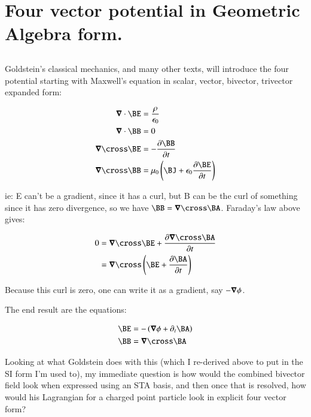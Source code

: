 \chapter{Four vector potential in Geometric Algebra form.} 

\section{}

Goldstein's classical mechanics, and many other texts, will introduce the four potential starting with 
Maxwell's equation in scalar, vector, bivector, trivector expanded form:

\begin{align*}
\spacegrad \cdot \BE &= \frac{\rho}{\epsilon_0} \\
\spacegrad \cdot \BB &= 0 \\
\spacegrad \cross \BE &= - \frac{\partial \BB}{\partial t} \\
\spacegrad \cross \BB &= \mu_0\left(\BJ + \epsilon_0 \frac{\partial \BE}{\partial t}\right) \\
\end{align*}

ie: E can't be a gradient, since it has a curl, but B can be the curl of something since it has zero
divergence, so we have $\BB = \spacegrad \cross \BA$.  Faraday's law above gives:

\begin{align*}
0 &= \spacegrad \cross \BE + \frac{\partial \spacegrad \cross \BA}{\partial t} \\
&= \spacegrad \cross \left(\BE + \frac{\partial \BA}{\partial t}\right) \\
\end{align*}

Because this curl is zero, one can write it as a gradient, say $-\boldsymbol{\nabla} \phi$.

The end result are the equations:

\begin{align}
\BE &= - \left( \spacegrad \phi + \partial_t \BA \right) \label{eqn:fourPot:BE} \\
\BB &= \spacegrad \cross \BA \label{eqn:fourPot:BB} 
\end{align}

Looking at what Goldstein does with this (which I re-derived above to put in the SI form I'm used to), my
immediate question is how would the combined bivector field look when expressed using an STA basis, and 
then once that is resolved, how would his Lagrangian for a charged point particle look in explicit four
vector form?


